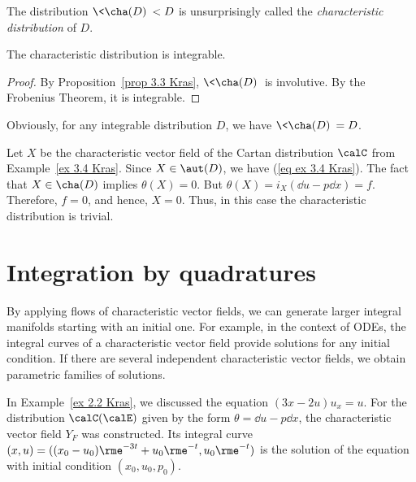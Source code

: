 The distribution $\<\cha(D)\><D$ is unsurprisingly called the \emph{characteristic distribution} of $D$.

\begin{cor}
    The characteristic distribution is integrable.
\end{cor}
\begin{proof}
    By Proposition~\ref{prop 3.3 Kras}, $\<\cha(D)\>$ is involutive. By the Frobenius Theorem, it is integrable.
\end{proof}

Obviously, for any integrable distribution $D$, we have $\<\cha(D)\>=D$.

\begin{example}
    Let $X$ be the characteristic vector field of the Cartan distribution $\calC$ from Example~\ref{ex 3.4 Kras}. Since $X\in\aut(D)$, we have (\ref{eq ex 3.4 Kras}). The fact that $X\in\cha(D)$ implies $\theta(X)=0$. But $\theta(X)=i_X(\dd u-p\dd x)=f$. Therefore, $f=0$, and hence, $X=0$. Thus, in this case the characteristic distribution is trivial.
\end{example}






\section{Integration by quadratures}


By applying flows of characteristic vector fields, we can generate larger integral manifolds starting with an initial one. For example, in the context of ODEs, the integral curves of a characteristic vector field provide solutions for any initial condition. If there are several independent characteristic vector fields, we obtain parametric families of solutions.

\begin{example}
    In Example~\ref{ex 2.2 Kras}, we discussed the equation $(3x-2u)u_x=u$. For the distribution $\calC(\calE)$ given by the form $\theta=\dd u-p\dd x$, the characteristic vector field $Y_F$ was constructed. Its integral curve $(x,u)=((x_0-u_0)\rme^{-3t}+u_0\rme^{-t},u_0\rme^{-t})$ is the solution of the equation with initial condition $(x_0,u_0,p_0)$.
\end{example}

